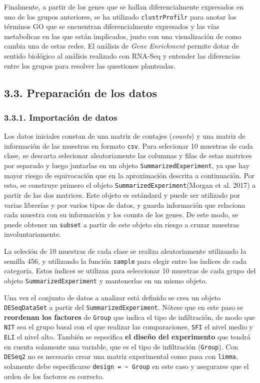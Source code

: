\documentclass[
]{article}
\begin{document}
Finalmente, a partir de los genes que se hallan diferencialmente
expresados en uno de los grupos anteriores, se ha utilizado
\texttt{clustrProfilr} para anotar los términos GO que se encuentran
diferencialmente expresados y las vías metabolicas en las que están
implicados, junto con una visualización de como cambia una de estas
redes. El análisis de \emph{Gene Enrichment} permite dotar de sentido
biológico al análisis realizado con RNA-Seq y entender las diferencias
entre los grupos para resolver las questiones planteadas.

\hypertarget{preparaciuxf3n-de-los-datos}{%
\subsection{3.3. Preparación de los
datos}\label{preparaciuxf3n-de-los-datos}}

\hypertarget{importaciuxf3n-de-datos}{%
\subsubsection{3.3.1. Importación de
datos}\label{importaciuxf3n-de-datos}}

Los datos iniciales constan de una matriz de contajes (\emph{counts}) y
una matriz de información de las muestras en formato \texttt{csv}. Para
selecionar 10 muestras de cada clase, se descarta selecionar
aleatoriamente las columnas y filas de estas matrices por separado y
luego juntarlas en un objeto \texttt{SummarizedExperiment}, ya que hay
mayor riesgo de equivocación que en la aproximación descrita a
continuación. Por esto, se construye primero el objeto
\texttt{SummarizedExperiment}(Morgan et al. 2017) a partir de las dos
matrices. Este objeto es estándard y puede ser utilizado por varias
librerías y por varios tipos de datos, y guarda información que
relaciona cada muestra con su información y los counts de los genes. De
este modo, se puede obtener un \texttt{subset} a partir de este objeto
sin riesgo a cruzar muestras involuntariamente.

La seleción de 10 muestras de cada clase se realiza aleatoriamente
utilizando la semilla 456, y utilizando la función \texttt{sample} para
elegir entre los índices de cada categoría. Estos índices se utilizan
para seleccionar 10 muestras de cada grupo del objeto
\texttt{SummarizedExperiment} y mantenerlas en un mismo objeto.

Una vez el conjunto de datos a analizar está definido se crea un objeto
\texttt{DESeqDataSet} a partir del \texttt{SummarizedExperiment}. Nótese
que en este paso se \textbf{reordenan los factores} de \texttt{Group}
que indica el tipo de infiltración, de modo que \texttt{NIT} sea el
grupo basal con el que realizar las comparaciones, \texttt{SFI} el nivel
medio y \texttt{ELI} el nivel alto. También se especifica \textbf{el
diseño del experimento} que tendrá en cuenta solamente una variable, que
es el tipo de infiltración (\texttt{Group}). Con \texttt{DESeq2} no es
necesario crear una matriz experimental como pasa con \texttt{limma},
solamente debe especificarse
\texttt{design\ =\ \textasciitilde{}\ Group} en este caso y asegurarse
que el orden de los factores es correcto.
\end{document}
